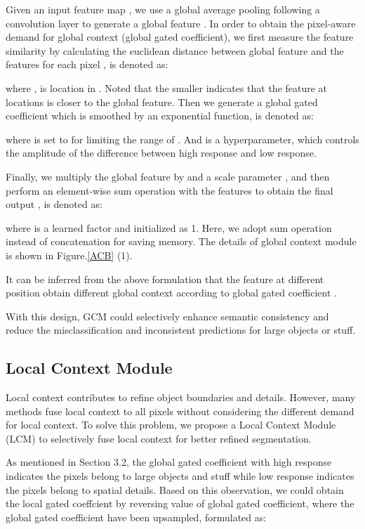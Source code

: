 \documentclass[10pt,twocolumn,letterpaper]{article}
\begin{document}
Given an input feature map , we use a global average pooling following a convolution layer to  generate a global feature . 
In order to obtain the pixel-aware demand for global context (global gated coefficient), we first measure the feature similarity  by calculating the  euclidean distance   between global feature  and  the features  for each pixel ,  is denoted as:

where  ,  is   location in .
Noted that  the smaller  indicates that the feature at  locations is closer to the global feature.  
Then we generate a global gated coefficient   which is smoothed by an exponential function,  is denoted as:

where    is set to   for limiting the range of . And  is a hyperparameter, which controls the amplitude of the difference between high response and low response.

Finally, we  multiply  the global feature  by  and a scale parameter , and  then perform an element-wise sum operation with the features  to obtain the final output ,  is denoted as:


where  is a learned factor  and  initialized as 1. Here, we adopt sum operation instead of concatenation for saving memory. The details of global context module is shown in Figure.\ref{ACB} (1).

 It can be inferred from the above formulation that the feature   at different position obtain different global context according to global gated  coefficient . 

With this design, GCM could  selectively enhance semantic consistency and  reduce the  misclassification and inconsistent predictions for large objects or stuff.

\subsection{Local Context Module}
Local context contributes to refine object boundaries and details. However, many methods fuse local context  to  all pixels without considering the different demand for local context.
To solve this problem, we propose
a Local Context Module (LCM) to selectively fuse local context for better refined segmentation.

As mentioned  in Section 3.2,  the  global gated coefficient with high response indicates the pixels belong to large objects and stuff while low response indicates the pixels belong to spatial details. Based on this observation, we could obtain the local gated coeffcient by reversing value of global gated coefficient, where the global gated coefficient have been upsampled, formulated as:
\end{document}
